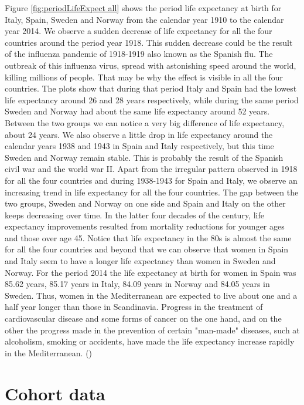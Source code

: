 Figure \ref{fig:periodLifeExpect all} shows the period life expectancy at birth for Italy, Spain, Sweden and Norway from the calendar year 1910 to the calendar year 2014.
We observe a sudden decrease of life expectancy  for all the four countries around the period year 1918. 
This sudden decrease could be the result of the influenza pandemic of 1918-1919 also known as the Spanish flu.
The outbreak of this influenza virus, spread with astonishing speed around the world, killing millions of people.
That may be why the effect is visible in all the four countries.
The plots show that during that period Italy and Spain had the lowest life expectancy around 26 and 28 years respectively, while during the same period Sweden and Norway had about the same life expectancy around 52 years.
Between the two groups we can notice a very big difference of life expectancy, about 24 years.
We also observe a little drop in life expectancy around the calendar years 1938 and 1943 in Spain and Italy respectively, but this time Sweden and Norway remain stable. 
This is probably the result of the Spanish civil war and the world war II.
Apart from the irregular pattern observed in 1918 for all the four countries and during 1938-1943 for Spain and Italy, we observe an increasing trend in life expectancy for all the four countries.
The gap between the two groups, Sweden and Norway on one side and Spain and Italy on the other keeps decreasing over time.
In the latter four decades of the century, life expectancy improvements resulted from mortality reductions for younger ages and those over age 45.
Notice that life expectancy in the 80s is almost the same for all the four countries and beyond that we can observe that women in Spain and Italy seem to have a longer life expectancy than women in Sweden and Norway. 
For the period 2014 the life expectancy at birth for women in Spain was 85.62 years, 85.17 years in Italy, 84.09 years in Norway and 84.05 years in Sweden. Thus, women in the Mediterranean are expected to live about one and a half year longer than those in Scandinavia. 
Progress in the treatment of cardiovascular disease and some forms of cancer on the one hand, and on the other the progress made in the prevention of certain "man-made" diseases, such at alcoholism, smoking or accidents, have made the life expectancy increase  rapidly in the Mediterranean. (\cite{VM04})

 
 
 
\section{Cohort data} 
 
